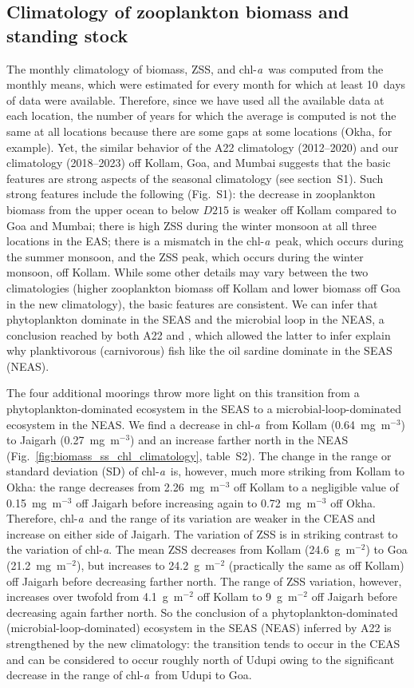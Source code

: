 \documentclass[authoryear,review,11pt]{elsarticle}
\newcommand{\chla}{chl-{\emph{a}}}
\begin{document}
\subsection{Climatology of zooplankton biomass and standing stock}
\label{sec:seasonal.climatology}

The monthly climatology of biomass, ZSS, and \chla\ was computed from the monthly means, which were estimated for every month for which at least 10~days of data were available.  Therefore, since we have used all the available data at each location, the number of years for which the average is computed is not the same at all locations because there are some gaps at some locations (Okha, for example). Yet, the similar behavior of the A22 climatology (2012--2020) and our climatology (2018--2023) off Kollam, Goa, and Mumbai suggests that the basic features are strong aspects of the seasonal climatology (see section~S1).  Such strong features include the following (Fig.~S1): the decrease in zooplankton biomass from the upper ocean to below $D215$ is weaker off Kollam compared to Goa and Mumbai; there is high ZSS during the winter monsoon at all three locations in the EAS; there is a mismatch in the \chla\ peak, which occurs during the summer monsoon, and the ZSS peak, which occurs during the winter monsoon, off Kollam.  While some other details may vary between the two climatologies (higher zooplankton biomass off Kollam and lower biomass off Goa in the new climatology), the basic features are consistent.  We can infer that phytoplankton dominate in the SEAS and the microbial loop in the NEAS, a conclusion reached by both A22 and \citet{shankar2019role}, which allowed the latter to infer explain why planktivorous (carnivorous) fish like the oil sardine dominate in the SEAS (NEAS).

The four additional moorings throw more light on this transition from a phytoplankton-dominated ecosystem in the SEAS to a microbial-loop-dominated ecosystem in the NEAS.  We find a decrease in \chla\ from Kollam (0.64~mg~m$^{-3}$) to Jaigarh (0.27~mg~m$^{-3}$) and an increase farther north in the NEAS (Fig.~\ref{fig:biomass_ss_chl_climatology}, table~S2).  The change in the range or standard deviation (SD) of \chla\ is, however, much more striking from Kollam to Okha: the range decreases from 2.26~mg~m$^{-3}$ off Kollam to a negligible value of 0.15~mg~m$^{-3}$ off Jaigarh before increasing again to 0.72~mg~m$^{-3}$ off Okha. Therefore, \chla\ and the range of its variation are weaker in the CEAS and increase on either side of Jaigarh.  The variation of ZSS is in striking contrast to the variation of \chla.  The mean ZSS decreases from Kollam (24.6~g~m$^{-2}$) to Goa (21.2~mg~m$^{-2}$), but increases to 24.2~g~m$^{-2}$ (practically the same as off Kollam) off Jaigarh before decreasing farther north.  The range of ZSS variation, however, increases over twofold from 4.1~g~m$^{-2}$ off Kollam to 9~g~m$^{-2}$ off Jaigarh before decreasing again farther north. So the conclusion of a phytoplankton-dominated (microbial-loop-dominated) ecosystem in the SEAS (NEAS) inferred by A22 is strengthened by the new climatology: the transition tends to occur in the CEAS and can be considered to occur roughly north of Udupi owing to the significant decrease in the range of \chla\ from Udupi to Goa.
\end{document}
